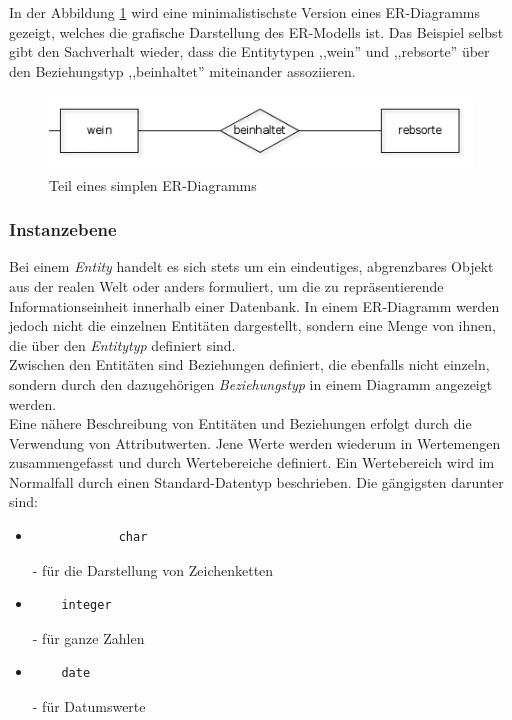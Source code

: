 \noindent
In der Abbildung \ref{Wieso das ER-Modell?} wird eine minimalistischste Version eines ER-Diagramms gezeigt, welches die grafische Darstellung des ER-Modells ist. Das Beispiel selbst gibt den Sachverhalt wieder, dass die Entitytypen ,,wein'' und ,,rebsorte'' über den Beziehungstyp ,,beinhaltet'' miteinander assoziieren.

\begin{figure}[H]
	\begin{center}
		\includegraphics[height=2cm]{images/simplesERD.png}
		\caption{Teil eines simplen ER-Diagramms}
		\label{Wieso das ER-Modell?}
	\end{center}
\end{figure}

\subsubsection{Instanzebene}
\prc
Bei einem \textit{Entity} handelt es sich stets um ein eindeutiges, abgrenzbares Objekt aus der realen Welt oder anders formuliert, um die zu repräsentierende Informationseinheit innerhalb einer Datenbank. In einem ER-Diagramm werden jedoch nicht die einzelnen Entitäten dargestellt, sondern eine Menge von ihnen, die über den \textit{Entitytyp} definiert sind.
\\

\noindent
Zwischen den Entitäten sind Beziehungen definiert, die ebenfalls nicht einzeln, sondern durch den dazugehörigen \textit{Beziehungstyp} in einem Diagramm angezeigt werden.
\\

\noindent
Eine nähere Beschreibung von Entitäten und Beziehungen erfolgt durch die Verwendung von Attributwerten. Jene Werte werden wiederum in Wertemengen zusammengefasst und durch Wertebereiche definiert.
\newline
\noindent
Ein Wertebereich wird im Normalfall durch einen Standard-Datentyp beschrieben. Die gängigsten darunter sind:
\\
\begin{itemize}
	\item \begin{verbatim}
			char
	\end{verbatim} 
	 - für die Darstellung von Zeichenketten
	\item \begin{verbatim}
	integer
	\end{verbatim} 
	 - für ganze Zahlen
	\item \begin{verbatim}
	date
	\end{verbatim} 
	 - für Datumswerte
	\\	
\end{itemize}

